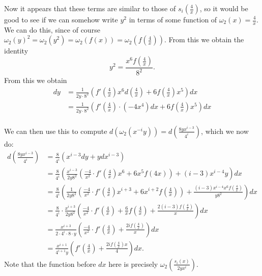 \documentclass[draft, 11pt]{article} %
\theoremstyle{plain}
\theoremstyle{remark}
\begin{document}
Now it appears that these terms are similar to those of $s_i \left( \frac{4}{x} \right)$, so it would be good to see if we can somehow write $y^2$ in terms of  some function of $\omega_2(x) = \frac{4}{x}$.
We can do this, since of course $\omega_2(y)^2 = \omega_2(y^2) = \omega_2(f(x)) = \omega_2\left( f \left(\frac{4}{x} \right) \right)$.
From this we obtain the identity
\begin{equation*}
y^2 = \frac{x^6 f \left(\frac{4}{x} \right)}{8^2}.
\end{equation*}
From this we obtain
\begin{align*}
dy & = \frac{1}{2y \cdot 8^2} \left( f'\left(\frac{4}{x} \right) x^6 d\left(  \frac{4}{x} \right) + 6 f\left( \frac{4}{x} \right) x^5  \right) dx \\
& = \frac{1}{2y \cdot 8^2} \left( f'\left(\frac{4}{x} \right) \cdot (-4 x^4) dx + 6 f\left( \frac{4}{x} \right) x^5  \right) dx \\
\end{align*}

We can then use this to compute $d (\omega_2(x^{-i}y)) = d \left( \frac{8yx^{i-3}}{4^i} \right)$, which we now do:
\begin{align*}
d\left( \frac{8yx^{i-3}}{4^i} \right) & = \frac{8}{4^i} \left( x^{i-3}dy + ydx^{i-3} \right) \\
& = \frac{8}{4^i} \left( \frac{x^{i-3}}{2y8^2} \left( \frac{-4}{x^2} \cdot f'\left( \frac{4}{x}  \right) x^6 + 6x^5 f\left( {4}{x} \right) \right) + (i-3)x^{i-4}y \right) dx \\
& = \frac{8}{4^i} \left( \frac{1}{2y8^2} \left(\frac{-4}{x^2} \cdot  f'\left( \frac{4}{x} \right) x^{i+3} + 6x^{i+2} f\left( \frac{4}{x} \right) \right) + \frac{(i-3)x^{i-4}x^6f \left( \frac{4}{x} \right)  }{y8^2} \right) dx \\
& = \frac{8}{4^i} \cdot \frac{x^{i+3}}{2y8^2} \left(\frac{-4}{x^2} \cdot  f' \left( \frac{4}{x} \right)  + \frac{6}{x} f \left( \frac{4}{x} \right)  + \frac{2(i-3)f \left( \frac{4}{x} \right)  }{x} \right) dx \\
& = \frac{x^{i+3}}{2 \cdot 4^i \cdot 8 \cdot y} \left(\frac{-4}{x^2} \cdot  f'\left( \frac{4}{x} \right)  + \frac{ 2i f \left( \frac{4}{x} \right) }{x} \right) dx \\
& = \frac{x^{i+1}}{4^{i+1}y} \left( f' \left(\frac{4}{x} \right) + \frac{2if \left( \frac{4}{x} \right) x}{4} \right) dx.
\end{align*}
Note that the function before $dx$ here is precisely $\omega_2\left(\frac{s_i(x)}{2yx^i} \right)$.
\end{document}
